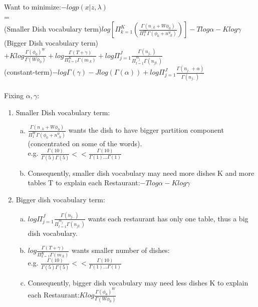 \documentclass{article}
\begin{document}
\begin{spacing}{1.1}
Want to minimize:$-log p(x|z,\lambda)$\\ =\\
(Smaller Dish vocabulary term)$ log[\Pi_{k=1}^{K}(\frac{\Gamma(n_{..k}+W\phi_{0})}{\Pi_{1}^{W}\Gamma(\phi_{0}+n_{..k}^{w})})]-Tlog\alpha-Klog\gamma$\\ 
(Bigger Dish vocabulary term)$+Klog\frac{\Gamma(\phi_{0})^{W}}{\Gamma(W\phi_{0})}+log\frac{\Gamma(T+\gamma)}{\Pi_{k=1}^{K}\Gamma(m_{.k})}+log \Pi_{j=1}^{J}\frac{\Gamma(n_{j..})}{\Pi_{t=1}^{m_{j}}\Gamma(n_{jt.})}$\\
(constant-term)$-log\Gamma(\gamma)-Jlog(\Gamma(\alpha))+log \Pi_{j=1}^{J}\frac{\Gamma(n_{j..}+\alpha)}{\Gamma(n_{j..})}$
\\ \\
Fixing $\alpha,\gamma$:\\
\begin{enumerate}
\item Smaller Dish vocabulary term:
\begin{enumerate}[(a)]
\item $\frac{\Gamma(n_{..k}+W\phi_{0})}{\Pi_{1}^{W}\Gamma(\phi_{0}+n_{..k}^{w})}$ wants the dish to have bigger partition component (concentrated on some of the words).\\
e.g. $\frac{\Gamma(10)}{\Gamma(5)\Gamma(5)}<<\frac{\Gamma(10)}{\Gamma(1)...\Gamma(1)}$
\item Consequently, smaller dish vocabulary may need more dishes K and more tables T to explain each Restaurant:$-Tlog\alpha-Klog\gamma$
\end{enumerate} 
\item Bigger dish vocabulary term:
\begin{enumerate}[(a)]
\item $log \Pi_{j=1}^{J}\frac{\Gamma(n_{j..})}{\Pi_{t=1}^{m_{j}}\Gamma(n_{jt.})}$ wants each restaurant has only one table, thus a big dish vocabulary.
\item $log\frac{\Gamma(T+\gamma)}{\Pi_{k=1}^{K}\Gamma(m_{.k})}$ wants smaller number of dishes:\\
e.g. $\frac{\Gamma(10)}{\Gamma(5)\Gamma(5)}<<\frac{\Gamma(10)}{\Gamma(1)...\Gamma(1)}$

\item Consequently, bigger dish vocabulary may need less dishes K to explain each Restaurant:$Klog\frac{\Gamma(\phi_{0})^{W}}{\Gamma(W\phi_{0})}$

\end{enumerate} 
\end{enumerate} 
\end{spacing}
\end{document}
